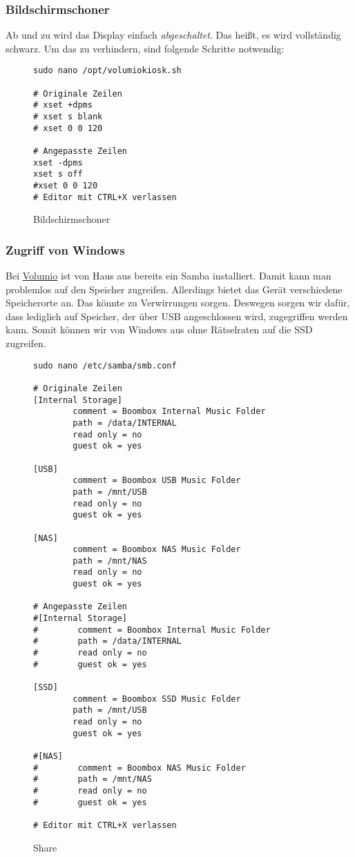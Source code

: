 \documentclass[12pt,a4paper]{article}
\newcommand{\vol}{\href{https://volumio.org/}{Volumio}\index{Volumio}}
\begin{document}
\subsubsection{Bildschirmschoner}
Ab und zu wird das Display einfach \textit{abgeschaltet}. Das heißt, es wird vollständig schwarz. Um das zu verhindern, sind folgende Schritte notwendig:

\begin{figure}[H]
\begin{lstlisting}
sudo nano /opt/volumiokiosk.sh

# Originale Zeilen
# xset +dpms
# xset s blank
# xset 0 0 120

# Angepasste Zeilen
xset -dpms
xset s off
#xset 0 0 120
# Editor mit CTRL+X verlassen
\end{lstlisting}
\caption{Bildschirmschoner}\label{fig:Bildschirmschoner}
\end{figure}

\subsubsection{Zugriff von Windows}
Bei \vol{} ist von Haus aus bereits ein Samba installiert. Damit kann man problemlos auf den Speicher zugreifen. Allerdings bietet das Gerät verschiedene
Speicherorte an. Das könnte zu Verwirrungen sorgen. Deswegen sorgen wir dafür, dass lediglich auf Speicher, der über USB angeschlossen wird, zugegriffen werden
kann. Somit können wir von Windows aus ohne Rätselraten auf die SSD zugreifen.

\begin{figure}[H]
\begin{lstlisting}
sudo nano /etc/samba/smb.conf

# Originale Zeilen
[Internal Storage]
        comment = Boombox Internal Music Folder
        path = /data/INTERNAL
        read only = no
        guest ok = yes

[USB]
        comment = Boombox USB Music Folder
        path = /mnt/USB
        read only = no
        guest ok = yes

[NAS]
        comment = Boombox NAS Music Folder
        path = /mnt/NAS
        read only = no
        guest ok = yes

# Angepasste Zeilen
#[Internal Storage]
#        comment = Boombox Internal Music Folder
#        path = /data/INTERNAL
#        read only = no
#        guest ok = yes

[SSD]
        comment = Boombox SSD Music Folder
        path = /mnt/USB
        read only = no
        guest ok = yes

#[NAS]
#        comment = Boombox NAS Music Folder
#        path = /mnt/NAS
#        read only = no
#        guest ok = yes

# Editor mit CTRL+X verlassen
\end{lstlisting}
\caption{Share}\label{fig:Share}
\end{figure}
\end{document}

